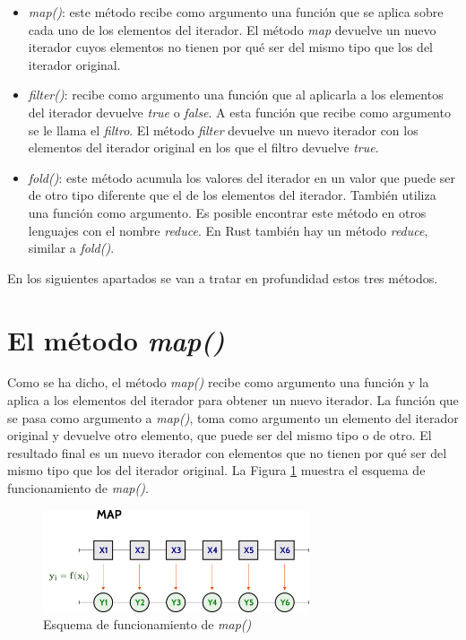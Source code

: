 \begin{itemize}
   \item \textit{map()}: este método recibe como argumento una función que se aplica sobre cada uno de los elementos del iterador. El método \textit{map} devuelve un nuevo iterador cuyos elementos no tienen por qué ser del mismo tipo que los del iterador original.
   \item \textit{filter()}: recibe como argumento una función que al aplicarla a los elementos del iterador devuelve \textit{true} o \textit{false}. A esta función que recibe como argumento se le llama el \textit{filtro}. El método \textit{filter} devuelve un nuevo iterador con los elementos del iterador original en los que el filtro devuelve \textit{true}.
   \item \textit{fold()}: este método acumula los valores del iterador en un valor que puede ser de otro tipo diferente que el de los elementos del iterador. También utiliza una función como argumento. Es posible encontrar este método en otros lenguajes con el nombre \textit{reduce}. En Rust también hay un método \textit{reduce}, similar a \textit{fold()}. 
\end{itemize}


En los siguientes apartados se van a tratar en profundidad estos tres métodos.

\section{El método \textit{map()}}
\noindent Como se ha dicho, el método \textit{map()} recibe como argumento una función y la aplica a los elementos del iterador para obtener un nuevo iterador. La función que se pasa como argumento a \textit{map()}, toma como argumento un elemento del iterador original y devuelve otro elemento, que puede ser del mismo tipo o de otro. El resultado final es un nuevo iterador con elementos que no tienen por qué ser del mismo tipo que los del iterador original. La Figura \ref{fig_map} muestra el esquema de funcionamiento de \textit{map()}.

\begin{figure}[htb]
   \begin{center}
      \includegraphics[width=0.7\textwidth]{img/map.png}
      \caption{Esquema de funcionamiento de \textit{map()}}
      \label{fig_map}
   \end{center}
\end{figure}

